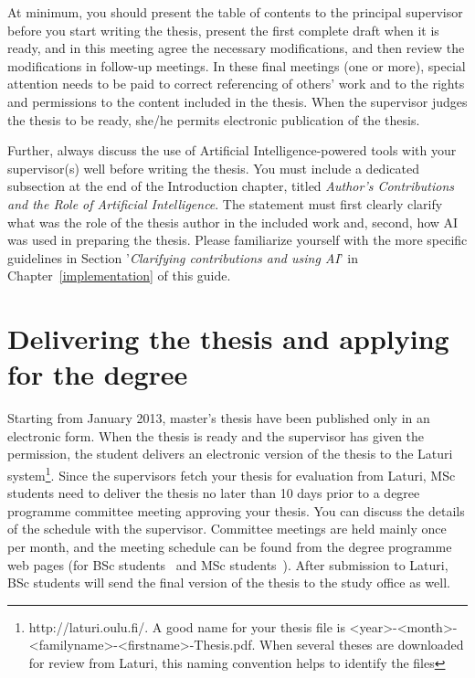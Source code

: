 At minimum, you should present the table of contents to the principal supervisor before you start writing the thesis, present the first complete draft when it is ready, and in this meeting agree the necessary modifications, and then review the modifications in follow-up meetings. In these final meetings (one or more), special attention needs to be paid to correct referencing of others’ work and to the rights and permissions to the content included in the thesis. When the supervisor judges the thesis to be ready, she/he permits electronic publication of the thesis.

Further, always discuss the use of Artificial Intelligence-powered tools with your supervisor(s) well before writing the thesis. You must include a dedicated subsection at the end of the Introduction chapter, titled \textit{Author's Contributions and the Role of Artificial Intelligence}. The statement must first clearly clarify what was the role of the thesis author in the included work and, second, how AI was used in preparing the thesis. Please familiarize yourself with the more specific guidelines in Section '\textit{Clarifying contributions and using AI}' in Chapter~\ref{implementation} of this guide.

\section{Delivering the thesis and applying for the degree}

Starting from January 2013, master’s thesis have been published only in an electronic form. When the thesis is ready and the supervisor has given the permission, the student delivers an electronic version of the thesis to the Laturi system\footnote{http://laturi.oulu.fi/. A good name for your thesis file is <year>-<month>-<familyname>-<firstname>-Thesis.pdf. When several theses are downloaded for review from Laturi, this naming convention helps to identify the files}. Since the supervisors fetch your thesis for evaluation from Laturi, MSc students need to deliver the thesis no later than 10 days prior to a degree programme committee meeting approving your thesis. You can discuss the details of the schedule with the supervisor. Committee meetings are held mainly once per month, and the meeting schedule can be found from the degree programme web pages (for BSc students~\cite{bscstudies} and MSc students~\cite{mscstudies}). After submission to Laturi, BSc students will send the final version of the thesis to the study office as well.

